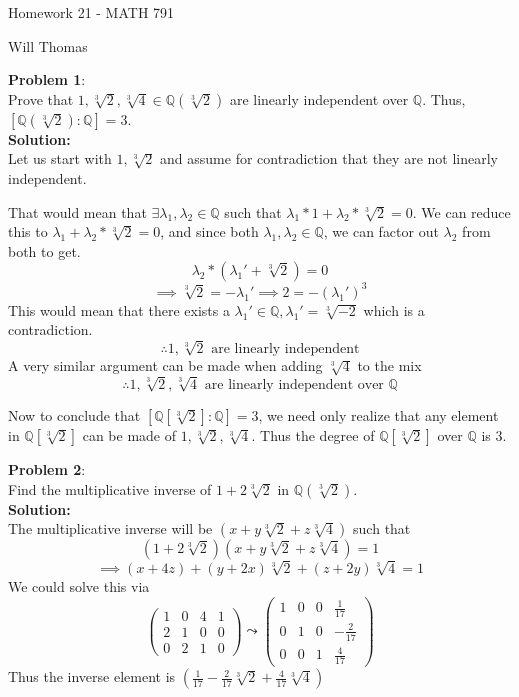\documentclass[11pt]{article}
\newcommand{\prob}[3]{\begin{flushleft}
        \textbf{Problem #1}: \\
        #2 
		\textbf{Solution:} 
		#3

\end{flushleft}}
\newcommand{\makeHWtitle}[1]{
    \begin{center}
    \Large{Homework #1 - MATH 791} 
        \vspace{5pt}
        
        \normalsize{Will Thomas}
        \vspace{5pt}
    \end{center}
}
\begin{document}
\makeHWtitle{21}

\prob{1}{
  Prove that $1, \sqrt[3]{2}, \sqrt[3]{4} \in \mathbb{Q}(\sqrt[3]{2})$
  are linearly independent over $\mathbb{Q}$.
  Thus, $[\mathbb{Q}(\sqrt[3]{2}) : \mathbb{Q}] = 3$. \\
}{\\
  Let us start with $1, \sqrt[3]{2}$ and assume for contradiction that they are not linearly independent.

  That would mean that $\exists \lambda_1, \lambda_2 \in \mathbb{Q}$ such that $\lambda_1 * 1 + \lambda_2 * \sqrt[3]{2} = 0$.
  We can reduce this to $\lambda_1 + \lambda_2 * \sqrt[3]{2} = 0$, and since both $\lambda_1, \lambda_2 \in \mathbb{Q}$, we can factor out $\lambda_2$ from both to get.
  $$\lambda_2 * (\lambda_1' + \sqrt[3]{2}) = 0$$
  $$\implies \sqrt[3]{2} = - \lambda_1' \implies 2 = - (\lambda_1')^3$$
  This would mean that there exists a $\lambda_1' \in \mathbb{Q}, \lambda_1' = \sqrt[3]{-2}$
  which is a contradiction.
  $$\therefore 1, \sqrt[3]{2} \text{ are linearly independent}$$
  A very similar argument can be made when adding $\sqrt[3]{4}$ to the mix
  $$\therefore 1, \sqrt[3]{2}, \sqrt[3]{4} \text{ are linearly independent over $\mathbb{Q}$}$$

  Now to conclude that $[\mathbb{Q}[\sqrt[3]{2}] : \mathbb{Q}] = 3$, we need only realize that
  any element in $\mathbb{Q}[\sqrt[3]{2}]$ can be made of $1, \sqrt[3]{2}, \sqrt[3]{4}$.
  Thus the degree of $\mathbb{Q}[\sqrt[3]{2}]$ over $\mathbb{Q}$ is $3$.
}

\prob{2}{
  Find the multiplicative inverse of $1 + 2 \sqrt[3]{2}$ in $\mathbb{Q}(\sqrt[3]{2})$. \\
}{\\
  The multiplicative inverse will be $(x + y \sqrt[3]{2} + z \sqrt[3]{4})$ such that
  $$(1 + 2 \sqrt[3]{2})(x + y \sqrt[3]{2} + z \sqrt[3]{4}) = 1$$
  $$\implies (x + 4z) + (y + 2x) \sqrt[3]{2} + (z + 2y) \sqrt[3]{4} = 1$$
  We could solve this via
  $$\begin{pmatrix}
      1 & 0 & 4 & 1 \\
      2 & 1 & 0 & 0 \\
      0 & 2 & 1 & 0
    \end{pmatrix} \leadsto
    \begin{pmatrix}
      1 & 0 & 0 & \frac{1}{17}  \\
      0 & 1 & 0 & -\frac{2}{17} \\
      0 & 0 & 1 & \frac{4}{17}
    \end{pmatrix}$$
  Thus the inverse element is $(\frac{1}{17} - \frac{2}{17} \sqrt[3]{2} + \frac{4}{17} \sqrt[3]{4})$
}
\end{document}

